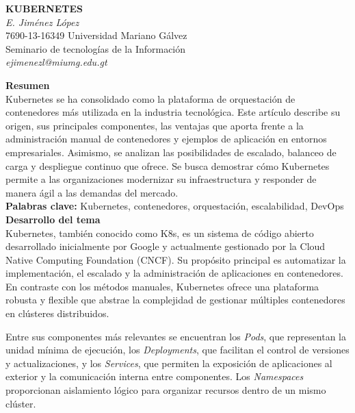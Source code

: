 \documentclass[12pt,letterpaper]{article}
\begin{document}

\begin{center}
\textbf{KUBERNETES} \\
\textit{E. Jiménez López} \\
7690-13-16349 Universidad Mariano Gálvez \\
Seminario de tecnologías de la Información \\
\textit{ejimenezl@miumg.edu.gt} \\
\end{center}

\textbf{Resumen} \\
Kubernetes se ha consolidado como la plataforma de orquestación de contenedores más utilizada en la industria tecnológica. Este artículo describe su origen, sus principales componentes, las ventajas que aporta frente a la administración manual de contenedores y ejemplos de aplicación en entornos empresariales. Asimismo, se analizan las posibilidades de escalado, balanceo de carga y despliegue continuo que ofrece. Se busca demostrar cómo Kubernetes permite a las organizaciones modernizar su infraestructura y responder de manera ágil a las demandas del mercado. \\

\textbf{Palabras clave:} Kubernetes, contenedores, orquestación, escalabilidad, DevOps \\

\textbf{Desarrollo del tema} \\
Kubernetes, también conocido como K8s, es un sistema de código abierto desarrollado inicialmente por Google y actualmente gestionado por la Cloud Native Computing Foundation (CNCF). Su propósito principal es automatizar la implementación, el escalado y la administración de aplicaciones en contenedores. En contraste con los métodos manuales, Kubernetes ofrece una plataforma robusta y flexible que abstrae la complejidad de gestionar múltiples contenedores en clústeres distribuidos. 

Entre sus componentes más relevantes se encuentran los \textit{Pods}, que representan la unidad mínima de ejecución, los \textit{Deployments}, que facilitan el control de versiones y actualizaciones, y los \textit{Services}, que permiten la exposición de aplicaciones al exterior y la comunicación interna entre componentes. Los \textit{Namespaces} proporcionan aislamiento lógico para organizar recursos dentro de un mismo clúster. 
\end{document}
